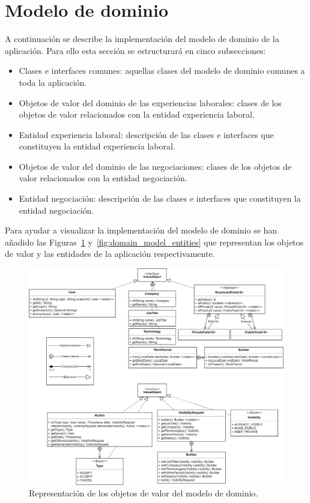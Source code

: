 \documentclass[a4paper, 12pt]{book}
\begin{document}
\section{Modelo de dominio}
\label{sec:domain_model_impl}
A continuación se describe la implementación del modelo de dominio de la aplicación. Para ello esta sección se estructurará en cinco subsecciones:

	\begin{itemize}
	\item Clases e interfaces comunes: aquellas clases del modelo de dominio comunes a toda la aplicación.
	\item Objetos de valor del dominio de las experiencias laborales: clases de los objetos de valor relacionados con la entidad experiencia laboral.
	\item Entidad experiencia laboral: descripción de las clases e interfaces que constituyen la entidad experiencia laboral.
	\item Objetos de valor del dominio de las negociaciones: clases de los objetos de valor relacionados con la entidad negociación.
	\item Entidad negociación: descripción de las clases e interfaces que constituyen la entidad negociación.
	\end{itemize}

Para ayudar a visualizar la implementación del modelo de dominio se han añadido las Figuras~\ref{fig:domain_model_vo} y~\ref{fig:domain_model_entities} que representan los objetos de valor y las entidades de la aplicación respectivamente.

\begin{figure}
  \centering
  \includegraphics[width=15cm, keepaspectratio]{img/Modelo_dominio_vo.png}
  \caption{Representación de los objetos de valor del modelo de dominio.}\label{fig:domain_model_vo}
\end{figure}
\end{document}
